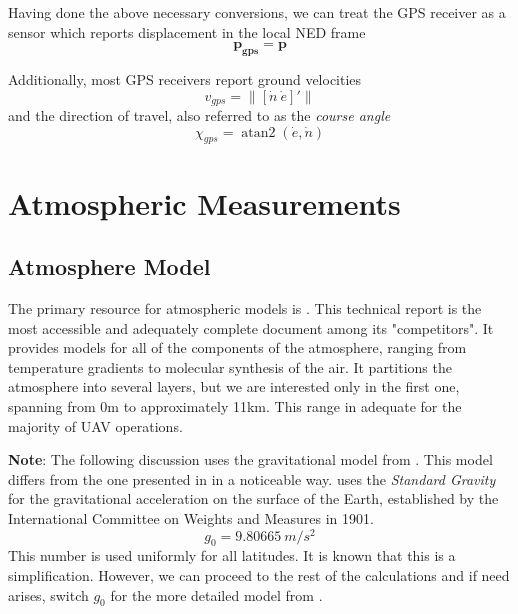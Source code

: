 Having done the above necessary conversions, we can treat the GPS receiver as a sensor which reports displacement in the local NED frame
\begin{equation}
	\bm{p_{gps}} = \bm{p}
\end{equation}

Additionally, most GPS receivers report ground velocities
\begin{equation}
	v_{gps} = \lVert [\dot{n}\ \dot{e}]' \rVert
\end{equation}
and the direction of travel, also referred to as the \emph{course angle}
\begin{equation}
	\chi_{gps} = \operatorname{atan2}\left({\dot{e}},{\dot{n}}\right)
\end{equation}


\section{Atmospheric Measurements}

\subsection{Atmosphere Model}
The primary resource for atmospheric models is \cite{USStdAtm76}. This technical report is the most accessible and adequately complete document among its "competitors". It provides models for all of the components of the atmosphere, ranging from temperature gradients to molecular synthesis of the air. It partitions the atmosphere into several layers, but we are interested only in the first one, spanning from 0m to approximately 11km. This range in adequate for the majority of UAV operations.

\textbf{Note}: The following discussion uses the gravitational model from \cite[eq.~17]{USStdAtm76}. This model differs from the one presented in \cite{Mulaire2000} in a noticeable way. \cite{USStdAtm76} uses the \emph{Standard Gravity} for the gravitational acceleration on the surface of the Earth, established by the International Committee on Weights and Measures in 1901.
\begin{equation} \label{eq:stdGravity}
	g_0 = 9.80665~ m/s^2
\end{equation}
This number is used uniformly for all latitudes. It is known that this is a simplification. However, we can proceed to the rest of the calculations and if need arises, switch $g_0$ for the more detailed model from \cite[eq.~4-1]{Mulaire2000}.

